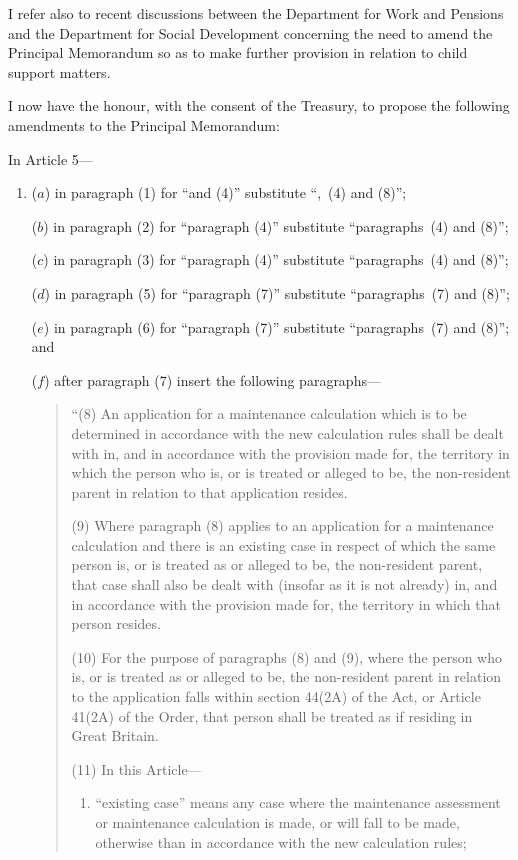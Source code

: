 \documentclass[12pt,a4paper]{article}
\begin{document}
I refer also to recent discussions between the Department for Work and Pensions and the Department for Social Development concerning the need to amend the Principal Memorandum so as to make further provision in relation to child support matters.

I now have the honour, with the consent of the Treasury, to propose the following amendments to the Principal Memorandum:

In Article 5---
\begin{enumerate}\item[]
($a$) in paragraph (1) for ``and (4)'' substitute ``,~(4) and (8)'';

($b$) in paragraph (2) for ``paragraph (4)'' substitute ``paragraphs~(4) and (8)'';

($c$) in paragraph (3) for ``paragraph (4)'' substitute ``paragraphs~(4) and (8)'';

($d$) in paragraph (5) for ``paragraph (7)'' substitute ``paragraphs~(7) and (8)'';

($e$) in paragraph (6) for ``paragraph (7)'' substitute ``paragraphs~(7) and (8)''; and

($f$) after paragraph (7) insert the following paragraphs---
\begin{quotation}
``(8) An application for a maintenance calculation which is to be determined in accordance with the new calculation rules shall be dealt with in, and in accordance with the provision made for, the territory in which the person who is, or is treated or alleged to be, the non-resident parent in relation to that application resides.

(9) Where paragraph (8) applies to an application for a maintenance calculation and there is an existing case in respect of which the same person is, or is treated as or alleged to be, the non-resident parent, that case shall also be dealt with (insofar as it is not already) in, and in accordance with the provision made for, the territory in which that person resides.

(10) For the purpose of paragraphs (8) and (9), where the person who is, or is treated as or alleged to be, the non-resident parent in relation to the application falls within section 44(2A) of the Act, or Article 41(2A) of the Order, that person shall be treated as if residing in Great Britain.

(11) In this Article---
\begin{enumerate}\item[]
``existing case'' means any case where the maintenance assessment or maintenance calculation is made, or will fall to be made, otherwise than in accordance with the new calculation rules;


\end{enumerate}
\end{quotation}
\end{enumerate}
\end{document}
